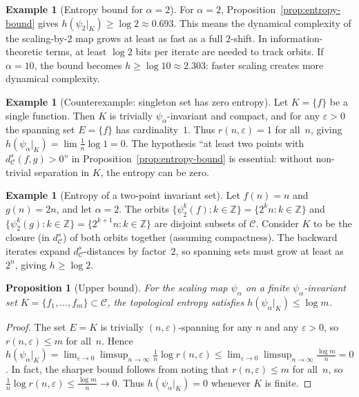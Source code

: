 \documentclass[11pt,a4paper]{article}
\theoremstyle{plain}
\newtheorem{propositioninner}[theoreminner]{Proposition}
\theoremstyle{definition}
\newtheorem{exampleinner}[theoreminner]{Example}
\newenvironment{proposition}[1][]{\begin{propositioninner}[#1]}{\end{propositioninner}}
\newenvironment{example}[1][]{\begin{exampleinner}[#1]}{\end{exampleinner}}
\newcommand{\Z}{\mathbb{Z}}
\newcommand{\C}{\mathcal{C}}
\newcommand{\eps}{\varepsilon}
\begin{document}
\begin{example}[Entropy bound for $\alpha=2$]\label{ex:entropy-alpha2}
For $\alpha=2$, Proposition~\ref{prop:entropy-bound} gives
$h(\psi_2|_K)\ge\log 2\approx 0.693$.  This means the dynamical
complexity of the scaling-by-$2$ map grows at least as fast as a
full $2$-shift.  In information-theoretic terms, at least $\log 2$
bits per iterate are needed to track orbits.  If $\alpha=10$,
the bound becomes $h\ge\log 10\approx 2.303$: faster scaling
creates more dynamical complexity.
\end{example}

\begin{example}[Counterexample: singleton set has zero entropy]
\label{ex:entropy-zero}
Let $K=\{f\}$ be a single function.  Then $K$ is trivially
$\psi_\alpha$-invariant and compact, and for any $\eps>0$ the
spanning set $E=\{f\}$ has cardinality~$1$.  Thus
$r(n,\eps)=1$ for all~$n$, giving
$h(\psi_\alpha|_K)=\lim\frac{1}{n}\log 1=0$.
The hypothesis ``at least two points with $d_\C^s(f,g)>0$''
in Proposition~\ref{prop:entropy-bound} is essential: without
non-trivial separation in $K$, the entropy can be zero.
\end{example}

\begin{example}[Entropy of a two-point invariant set]\label{ex:entropy-two-point}
Let $f(n)=n$ and $g(n)=2n$, and let $\alpha=2$.  The orbits
$\{\psi_2^k(f):k\in\Z\}=\{2^k n: k\in\Z\}$ and
$\{\psi_2^k(g):k\in\Z\}=\{2^{k+1} n: k\in\Z\}$ are disjoint
subsets of $\C$.  Consider $K$ to be the closure (in $d_\C^s$)
of both orbits together (assuming compactness).  The backward
iterates expand $d_\C^s$-distances by factor~$2$, so spanning
sets must grow at least as $2^n$, giving $h\ge\log 2$.
\end{example}

\begin{proposition}[Upper bound]\label{prop:entropy-upper}
For the scaling map $\psi_\alpha$ on a finite
$\psi_\alpha$-invariant set $K=\{f_1,\ldots,f_m\}\subset\C$, the
topological entropy satisfies $h(\psi_\alpha|_K)\le\log m$.
\end{proposition}

\begin{proof}
The set $E=K$ is trivially $(n,\eps)$-spanning for any $n$ and
any $\eps>0$, so $r(n,\eps)\le m$ for all~$n$.  Hence
$h(\psi_\alpha|_K)=\lim_{\eps\to 0}\limsup_{n\to\infty}
\frac{1}{n}\log r(n,\eps)\le\lim_{\eps\to 0}\limsup_{n\to\infty}
\frac{\log m}{n}=0$.
In fact, the sharper bound follows from noting that $r(n,\eps)\le m$
for all~$n$, so $\frac{1}{n}\log r(n,\eps)\le\frac{\log m}{n}\to 0$.
Thus $h(\psi_\alpha|_K)=0$ whenever $K$ is finite.
\end{proof}
\end{document}
